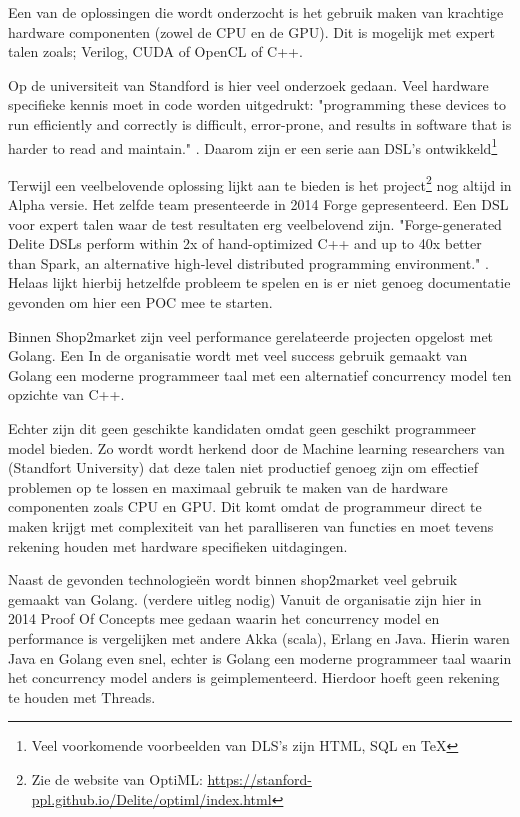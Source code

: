 Een van de oplossingen die wordt onderzocht is het gebruik maken van krachtige hardware componenten (zowel de CPU en de GPU). Dit is mogelijk met expert talen zoals; Verilog, CUDA of OpenCL of C++.

Op de universiteit van Standford is hier veel onderzoek gedaan. Veel hardware specifieke kennis moet in code worden uitgedrukt: "programming these devices to run efficiently and correctly is difficult, error-prone, and results in software that is harder to read and maintain." \parencite{sujeeth2011optiml}. Daarom zijn er een serie aan DSL's ontwikkeld\footnote{Veel voorkomende voorbeelden van DLS's zijn HTML, SQL en \TeX \parencite{sigplan2000dsl}}

Terwijl \textcite{sujeeth2011optiml} een veelbelovende oplossing lijkt aan te bieden is het project\footnote{Zie de website van OptiML: \url{https://stanford-ppl.github.io/Delite/optiml/index.html}} nog altijd in Alpha versie. Het zelfde team presenteerde in 2014 Forge gepresenteerd. Een DSL voor expert talen waar de test resultaten erg veelbelovend zijn. "Forge-generated Delite DSLs perform within 2x of hand-optimized C++ and up to 40x better than Spark, an alternative high-level distributed programming environment." \parencite{sujeeth2014forge}. Helaas lijkt hierbij hetzelfde probleem te spelen en is er niet genoeg documentatie gevonden om hier een POC mee te starten.

Binnen Shop2market zijn veel performance gerelateerde projecten opgelost met Golang. Een In de organisatie wordt met veel success gebruik gemaakt van Golang een moderne programmeer taal met een alternatief concurrency model ten opzichte van C++.

Echter zijn dit geen geschikte kandidaten omdat geen geschikt programmeer model bieden. Zo wordt wordt herkend door de Machine learning researchers van (Standfort University) \cite{sujeeth2011optiml} dat deze talen niet productief genoeg zijn om effectief problemen op te lossen en maximaal gebruik te maken van de hardware componenten zoals CPU en GPU. Dit komt omdat de programmeur direct te maken krijgt met complexiteit van het paralliseren van functies en moet tevens rekening houden met hardware specifieken uitdagingen. \parencite{chafi2010language}




Naast de gevonden technologieën wordt binnen shop2market veel gebruik gemaakt van Golang. (verdere uitleg nodig)
Vanuit de organisatie zijn hier in 2014 Proof Of Concepts mee gedaan waarin het concurrency model en performance is vergelijken met andere Akka (scala), Erlang en Java. Hierin waren Java en Golang even snel, echter is Golang een moderne programmeer taal waarin het concurrency model anders is geimplementeerd. Hierdoor hoeft geen rekening te houden met Threads.

